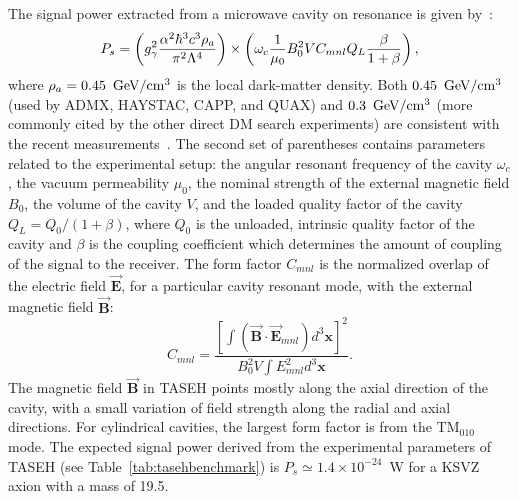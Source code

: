 The signal power extracted from a microwave cavity on resonance is given 
by~\cite{HAYSTACIII}:
\begin{equation}
P_s = \left(g_{\gamma}^2\frac{\alpha^2\hbar^3c^3\rho_a}{\pi^2\Lambda^4}\right)\times
\left(\omega_c\frac{1}{\mu_0}B_0^2VC_{mnl}Q_L\frac{\beta}{1+\beta}\right),
\label{eq:ps}
\end{equation}
where $\rho_a=0.45~\,\text{Ge\hspace{-.08em}V}/\mathrm{cm}^3$ is the local dark-matter 
density. 
Both $0.45~\,\text{Ge\hspace{-.08em}V}/\mathrm{cm}^3$ (used by ADMX, HAYSTAC, 
CAPP, and QUAX) and $0.3~\,\text{Ge\hspace{-.08em}V}/\mathrm{cm}^3$ (more commonly cited 
by the other direct DM search experiments) are consistent with the recent 
measurements~\cite{Read:2014qva,PDG}. 
The second set of parentheses contains parameters related to the experimental 
setup: the angular resonant frequency of the cavity $\omega_c$, 
the vacuum permeability $\mu_0$, the nominal strength of the external magnetic 
field $B_0$, the volume of the cavity $V$, and the loaded quality factor of 
the cavity 
\(Q_L=Q_0/(1+\beta)\), where $Q_0$ is the unloaded, intrinsic quality factor 
of the cavity and $\beta$ is the coupling coefficient which determines the 
amount 
of coupling of the signal to the receiver. The form factor $C_{mnl}$ is the 
normalized overlap of the electric field 
$\vec{\bm{E}}$, for a particular cavity resonant mode, with the external magnetic 
field $\vec{\bm{B}}$:
\begin{equation}
  C_{mnl} = \frac{\left[\int\left( \vec{\bm{B}}\cdot\vec{\bm{E}}_{mnl}\right) d^3\bm{x}\right]^2}{B_0^2V\int E_{mnl}^2 d^3\bm{x}}.
\label{eq:formfactor} 
\end{equation} 
The magnetic field $\vec{\bm{B}}$ in TASEH points mostly along the axial 
direction of the cavity, with a small variation of 
field strength along the radial and axial directions.  
For cylindrical cavities, the largest form factor is from the 
TM$_{010}$ mode. The expected signal power derived from the experimental 
parameters of TASEH (see Table~\ref{tab:tasehbenchmark}) 
is $P_s\simeq 1.4\times10^{-24}$~W for a KSVZ axion with a 
mass of 19.5\muevcc. 

